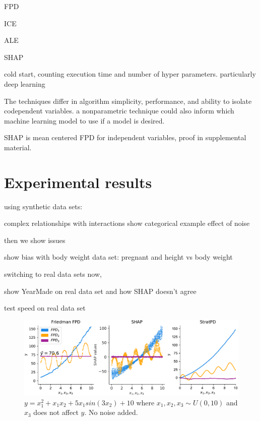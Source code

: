 \documentclass{article}
\begin{document}
FPD

ICE

ALE

SHAP

cold start, counting execution time and number of hyper parameters. particularly deep learning

The techniques differ in algorithm simplicity, performance, and ability to isolate codependent variables. a nonparametric technique could also inform which machine learning model to use if a model is desired.

SHAP is mean centered FPD for independent variables, proof in supplemental material.

\section{Experimental results}\label{sec:experiments} 

using synthetic data sets:

	complex relationships with interactions
	show categorical example
	effect of noise

then we show issues
 
show bias with body weight data set: pregnant and height vs body weight

switching to real data sets now,

	show YearMade on real data set and how SHAP doesn't  agree

test speed on real data set

\begin{figure}[htbp]
\begin{center}
\includegraphics[scale=0.35]{images/interactions.pdf}
\caption{\small $y = x_1^2 + x_1 x_2 + 5 x_1 sin(3 x_2) + 10$ where $x_1,x_2,x_3 \sim U(0,10)$ and $x_3$ does not affect $y$. No noise added.}
\label{fig:interactions}
\end{center}
\end{figure}
\end{document}

